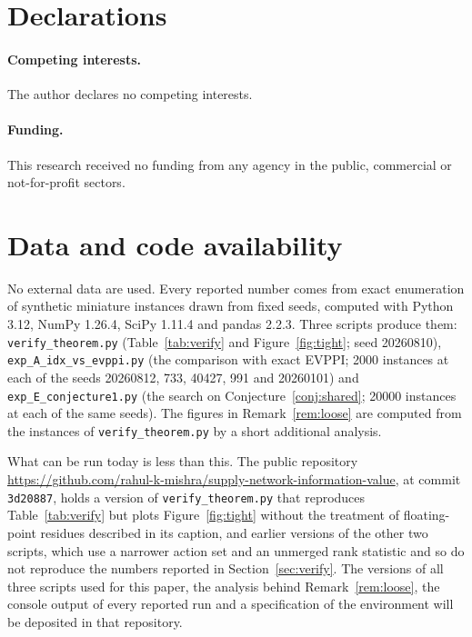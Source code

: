 \documentclass[pdflatex,sn-mathphys-num]{sn-jnl}
\theoremstyle{thmstyleone}
\theoremstyle{thmstyletwo}
\theoremstyle{thmstylethree}
\begin{document}
\section*{Declarations}

\paragraph{Competing interests.} The author declares no competing interests.

\paragraph{Funding.} This research received no funding from any agency in the
public, commercial or not-for-profit sectors.

\section*{Data and code availability}

No external data are used. Every reported number comes from exact
enumeration of synthetic miniature instances drawn from fixed seeds, computed
with Python 3.12, NumPy 1.26.4, SciPy 1.11.4 and pandas 2.2.3. Three scripts
produce them: \texttt{verify\_theorem.py} (Table~\ref{tab:verify} and
Figure~\ref{fig:tight}; seed 20260810), \texttt{exp\_A\_idx\_vs\_evppi.py}
(the comparison with exact EVPPI; 2000 instances at each of the seeds
20260812, 733, 40427, 991 and 20260101) and \texttt{exp\_E\_conjecture1.py}
(the search on Conjecture~\ref{conj:shared}; 20000 instances at each of the
same seeds). The figures in Remark~\ref{rem:loose} are computed from the
instances of \texttt{verify\_theorem.py} by a short additional analysis.

What can be run today is less than this. The public repository
\url{https://github.com/rahul-k-mishra/supply-network-information-value}, at
commit \texttt{3d20887}, holds a version of \texttt{verify\_theorem.py} that
reproduces Table~\ref{tab:verify} but plots Figure~\ref{fig:tight} without
the treatment of floating-point residues described in its caption, and
earlier versions of the other two scripts, which use a narrower action set
and an unmerged rank statistic and so do not reproduce the numbers reported
in Section~\ref{sec:verify}. The versions of all three scripts used for this
paper, the analysis behind Remark~\ref{rem:loose}, the console output of
every reported run and a specification of the environment will be deposited
in that repository.
\end{document}

